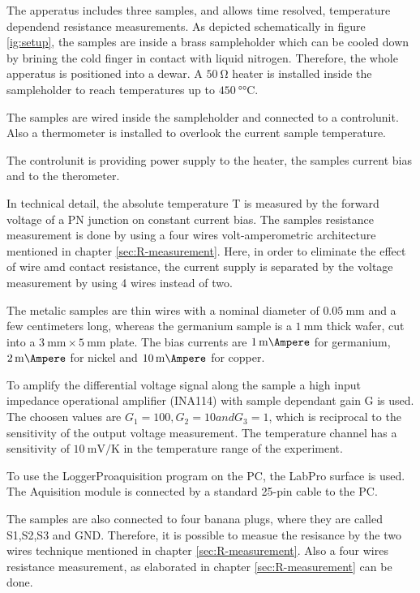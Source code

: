 The apperatus includes three samples, and allows time resolved, temperature dependend resistance measurements.
As depicted schematically in figure \ref{ig:setup}, the samples are inside a brass sampleholder which can be cooled down by brining the cold finger in contact with liquid nitrogen.
Therefore, the whole apperatus is positioned into a dewar.
A $\SI{50}{\ohm}$ heater is installed inside the sampleholder to reach temperatures up to $\SI{450}{\degree\celsius}$.

The samples are wired inside the sampleholder and connected to a controlunit.
Also a thermometer is installed to overlook the current sample temperature.

The controlunit is providing power supply to the heater, the samples current bias and to the therometer.

In technical detail, the absolute temperature T is measured by the forward voltage of a PN junction on constant current bias. 
The samples resistance measurement is done by using a four wires volt-amperometric architecture mentioned in chapter \ref{sec:R-measurement}. 
Here, in order to eliminate the effect of wire amd contact resistance, the current supply is separated by the voltage measurement by using 4 wires instead of two.

The metalic samples are thin wires with a nominal diameter of $\SI{0.05}{\milli\meter}$ and a few centimeters long, whereas the germanium sample is a $\SI{1}{\milli\meter}$ thick wafer, cut into a $\SI{3}{\milli\meter} \times \SI{5}{\milli\meter}$ plate.
The bias currents are $\SI{1}{\milli\Ampere}$ for germanium, $\SI{2}{\milli\Ampere}$ for nickel and $\SI{10}{\milli\Ampere}$ for copper.

To amplify the differential voltage signal along the sample a high input impedance operational amplifier (INA114) with sample dependant gain G is used.
The choosen values are $G_1 = 100,G_2=10 and G_3=1$, which is reciprocal to the sensitivity of the output voltage measurement.
The temperature channel has a sensitivity of $\SI{10}{\milli\volt\per\kelvin}$ in the temperature range of the experiment.

To use the LoggerProaquisition program on the PC, the LabPro surface is used. 
The Aquisition module is connected by a standard 25-pin cable to the PC.

The samples are also connected to four banana plugs, where they are called S1,S2,S3 and GND.
Therefore, it is possible to measue the resisance by the two wires technique mentioned in chapter \ref{sec:R-measurement}.
Also a four wires resistance measurement, as elaborated in chapter \ref{sec:R-measurement} can be done.

